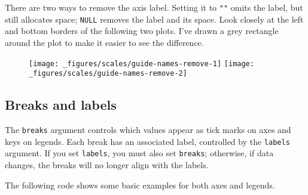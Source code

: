 There are two ways to remove the axis label. Setting it to \texttt{""}
omits the label, but still allocates space; \texttt{NULL} removes the
label and its space. Look closely at the left and bottom borders of the
following two plots. I've drawn a grey rectangle around the plot to make
it easier to see the difference.

\begin{Shaded}
\begin{Highlighting}[]
\StringTok{ }\OperatorTok{+}\StringTok{ }
\StringTok{  }\NormalTok{() }\OperatorTok{+}\StringTok{ }
\StringTok{  }\NormalTok{(} \NormalTok{(} \NormalTok{))}
\OperatorTok{+}\StringTok{ }\NormalTok{(} \NormalTok{,  } \NormalTok{)}
\OperatorTok{+}\StringTok{ }\NormalTok{(} \NormalTok{, } \NormalTok{)}
\end{Highlighting}
\end{Shaded}

\begin{figure}[H]
  \texttt{[image: \_figures/scales/guide-names-remove-1]}%
  \texttt{[image: \_figures/scales/guide-names-remove-2]}
\end{figure}

\hypertarget{breaks-and-labels}{%
\subsection{Breaks and labels}\label{breaks-and-labels}}

The \texttt{breaks} argument controls which values appear as tick marks
on axes and keys on legends. Each break has an associated label,
controlled by the \texttt{labels} argument. If you set \texttt{labels},
you must also set \texttt{breaks}; otherwise, if data changes, the
breaks will no longer align with the labels. 
  

The following code shows some basic examples for both axes and legends.

